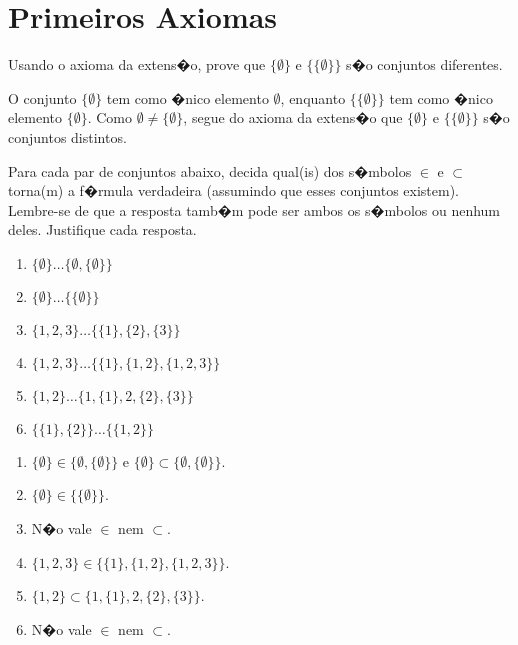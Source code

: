 \chapter{Primeiros Axiomas}

\setcounter{ex}{0}

\begin{exercicio}
	Usando o axioma da extens�o, prove que $\{\emptyset\}$ e $\{\{\emptyset\}\}$ s�o conjuntos diferentes.
\end{exercicio}
\begin{solucao}
	O conjunto $\{\emptyset\}$ tem como �nico elemento $\emptyset$, enquanto $\{\{\emptyset\}\}$ tem como �nico elemento $\{\emptyset\}$. Como $\emptyset\neq\{\emptyset\}$, segue do axioma da extens�o que $\{\emptyset\}$ e $\{\{\emptyset\}\}$ s�o conjuntos distintos.
\end{solucao}

\begin{exercicio}
	Para cada par de conjuntos abaixo, decida qual(is) dos s�mbolos $\in$ e $\subset$ torna(m) a f�rmula verdadeira (assumindo que esses conjuntos existem). Lembre-se de que a resposta tamb�m pode ser ambos os s�mbolos ou nenhum deles. Justifique cada resposta.
	\begin{enumerate}[label=(\alph{*})]
		\item $\{\emptyset\}\ldots\{\emptyset,\{\emptyset\}\}$
		\item $\{\emptyset\}\ldots\{\{\emptyset\}\}$
		\item $\{1,2,3\}\ldots\{\{1\},\{2\},\{3\}\}$
		\item $\{1,2,3\}\ldots\{\{1\},\{1,2\},\{1,2,3\}\}$
		\item $\{1,2\}\ldots\{1,\{1\},2,\{2\},\{3\}\}$
		\item $\{\{1\},\{2\}\}\ldots\{\{1,2\}\}$
	\end{enumerate}
\end{exercicio}
\begin{solucao}
	\begin{enumerate}[label=(\alph{*})]
		\item $\{\emptyset\}\in\{\emptyset,\{\emptyset\}\}$ e $\{\emptyset\}\subset\{\emptyset,\{\emptyset\}\}$.
		\item $\{\emptyset\}\in\{\{\emptyset\}\}$.
		\item N�o vale $\in$ nem $\subset$.
		\item $\{1,2,3\}\in\{\{1\},\{1,2\},\{1,2,3\}\}$.
		\item $\{1,2\}\subset\{1,\{1\},2,\{2\},\{3\}\}$.
		\item N�o vale $\in$ nem $\subset$.
	\end{enumerate}
\end{solucao}

